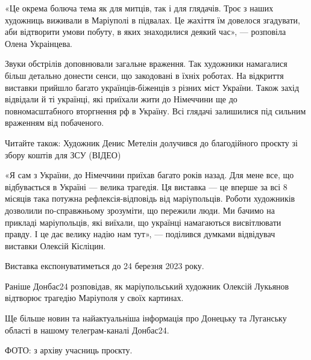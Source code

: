 «Це окрема болюча тема як для митців, так і для глядачів. Троє з наших
художниць виживали в Маріуполі в підвалах. Це жахіття їм довелося згадувати,
аби відтворити умови побуту, в яких знаходилися деякий час», — розповіла Олена
Украінцева.

Звуки обстрілів доповнювали загальне враження. Так художники намагалися більш
детально донести сенси, що закодовані в їхніх роботах. На відкриття виставки
прийшло багато українців-біженців з різних міст України. Також захід відвідали
й ті українці, які приїхали жити до Німеччини ще до повномасштабного вторгнення
рф в Україну. Всі глядачі залишилися під сильним враженням від побаченого.

Читайте також: Художник Денис Метелін долучився до благодійного проєкту зі
збору коштів для ЗСУ (ВІДЕО)

«Я сам з України, до Німеччини приїхав багато років назад. Для мене все, що
відбувається в Україні — велика трагедія. Ця виставка — це вперше за всі 8
місяців така потужна рефлексія-відповідь від маріупольців. Роботи художників
дозволили по-справжньому зрозуміти, що пережили люди. Ми бачимо на прикладі
маріупольців, які виїхали, що українці намагаються висвітлювати правду. І це
дає велику надію нам тут», — поділився думками відвідувач виставки Олексій
Кісліцин.

Виставка експонуватиметься до 24 березня 2023 року.

Раніше Донбас24 розповідав, як маріупольський художник Олексій Лукьянов
відтворює трагедію Маріуполя у своїх картинах.

Ще більше новин та найактуальніша інформація про Донецьку та Луганську області
в нашому телеграм-каналі Донбас24.

ФОТО: з архіву учасниць проєкту.
